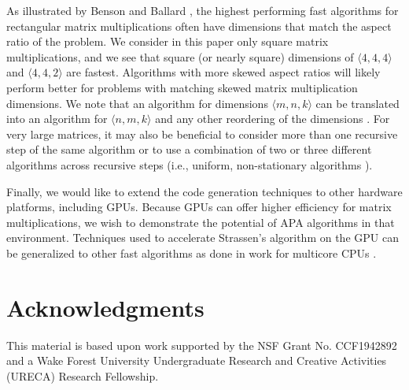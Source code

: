 \documentclass[conference]{IEEEtran}
\newcommand{\dims}[1]{\langle #1 \rangle}
\begin{document}
As illustrated by Benson and Ballard \cite{BB15}, the highest performing fast algorithms for rectangular matrix multiplications often have dimensions that match the aspect ratio of the problem.
We consider in this paper only square matrix multiplications, and we see that square (or nearly square) dimensions of $\dims{4,4,4}$ and $\dims{4,4,2}$ are fastest.
Algorithms with more skewed aspect ratios will likely perform better for problems with matching skewed matrix multiplication dimensions.
We note that an algorithm for dimensions $\dims{m,n,k}$ can be translated into an algorithm for $\dims{n,m,k}$ and any other reordering of the dimensions \cite{BB15}.
For very large matrices, it may also be beneficial to consider more than one recursive step of the same algorithm or to use a combination of two or three different algorithms across recursive steps (i.e., uniform, non-stationary algorithms \cite{BBDLS16}).

Finally, we would like to extend the code generation techniques to other hardware platforms, including GPUs.
Because GPUs can offer higher efficiency for matrix multiplications, we wish to demonstrate the potential of APA algorithms in that environment.
Techniques used to accelerate Strassen's algorithm on the GPU \cite{HYvdG20,LAES13} can be generalized to other fast algorithms as done in work for multicore CPUs \cite{BB15,HRMvdG17}.

\section*{Acknowledgments}

This material is based upon work supported by the NSF Grant No. CCF1942892 and a Wake Forest University Undergraduate Research and Creative Activities (URECA) Research Fellowship.



\end{document}
